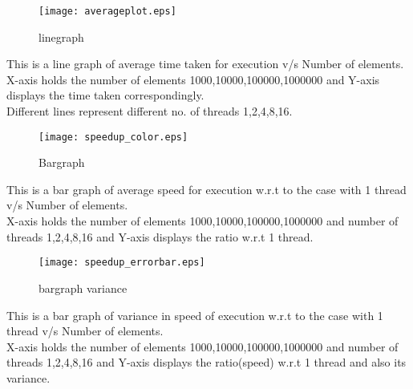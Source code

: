 \documentclass{article}
\begin{document}
\begin{figure}
\texttt{[image: averageplot.eps]}
\caption{linegraph}
\label{fig:avg graph}
\end{figure}
\noindent
This is a line graph of average time taken for execution v/s Number of elements. \\
X-axis holds the number of elements {1000,10000,100000,1000000} and Y-axis displays the time taken correspondingly. \\
Different lines represent different no. of threads {1,2,4,8,16}.

\clearpage

\begin{figure}
\texttt{[image: speedup\_color.eps]}
\caption{Bargraph}
\label{fig:Scatter graph}
\end{figure}
\noindent
This is a bar graph of average speed for execution w.r.t to the case with 1 thread v/s Number of elements. \\
X-axis holds the number of elements {1000,10000,100000,1000000} and number of threads {1,2,4,8,16} and Y-axis displays the ratio w.r.t 1 thread.

\clearpage

\begin{figure}
\texttt{[image: speedup\_errorbar.eps]}
\caption{bargraph variance}
\label{fig:Scatter graph}
\end{figure}
\noindent
This is a bar graph of variance in speed of execution w.r.t to the case with 1 thread v/s Number of elements. \\
X-axis holds the number of elements {1000,10000,100000,1000000} and number of threads {1,2,4,8,16} and Y-axis displays the ratio(speed) w.r.t 1 thread and also its variance.
\end{document}
